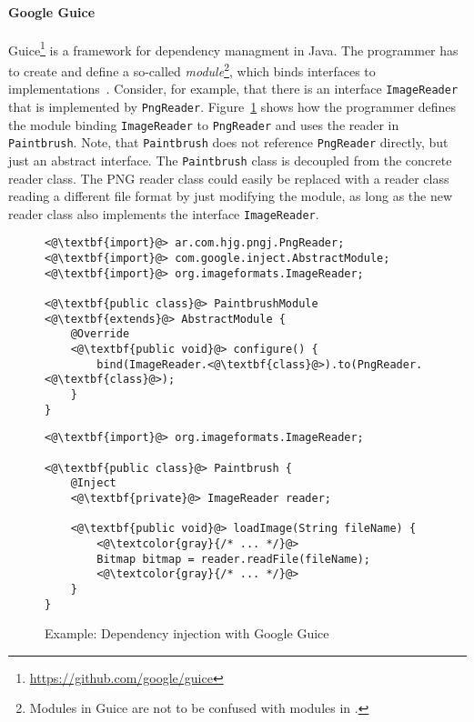 \paragraph{Google Guice}
Guice\footnote{\url{https://github.com/google/guice}} is a framework for dependency managment in Java. The programmer has to create and define a so-called \emph{module}\footnote{Modules in Guice are not to be confused with modules in \msname.}, which binds interfaces to implementations~\cite{Vanbrabant:2008:GGA:1373340}. Consider, for example, that there is an interface \texttt{ImageReader} that is implemented by \texttt{PngReader}. Figure~\ref{fig:rel_dep_inj_guice} shows how the programmer defines the module binding \texttt{ImageReader} to \texttt{PngReader} and uses the reader in \texttt{Paintbrush}. Note, that \texttt{Paintbrush} does not reference \texttt{PngReader} directly, but just an abstract interface. The \texttt{Paintbrush} class is decoupled from the concrete reader class. The PNG reader class could easily be replaced with a reader class reading a different file format by just modifying the module, as long as the new reader class also implements the interface \texttt{ImageReader}.

\begin{figure}[!htp]
\begin{lstlisting}
<@\textbf{import}@> ar.com.hjg.pngj.PngReader;
<@\textbf{import}@> com.google.inject.AbstractModule;
<@\textbf{import}@> org.imageformats.ImageReader;

<@\textbf{public class}@> PaintbrushModule <@\textbf{extends}@> AbstractModule {
    @Override
    <@\textbf{public void}@> configure() {
        bind(ImageReader.<@\textbf{class}@>).to(PngReader.<@\textbf{class}@>);
    }
}
\end{lstlisting}

\begin{lstlisting}
<@\textbf{import}@> org.imageformats.ImageReader;

<@\textbf{public class}@> Paintbrush {
    @Inject
    <@\textbf{private}@> ImageReader reader;

    <@\textbf{public void}@> loadImage(String fileName) {
        <@\textcolor{gray}{/* ... */}@>
        Bitmap bitmap = reader.readFile(fileName);
        <@\textcolor{gray}{/* ... */}@>
    }
}
\end{lstlisting}

\caption{Example: Dependency injection with Google Guice}
\label{fig:rel_dep_inj_guice}
\end{figure}

